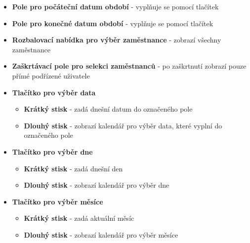 \documentclass{diplomka}
\begin{document}
\begin{itemize}
\item \textbf{Pole pro počáteční datum období} - vyplňuje se pomocí tlačítek
\item \textbf{Pole pro konečné datum období} - vyplňuje se pomocí tlačítek
\item \textbf{Rozbalovací nabídka pro výběr zaměstnance} - zobrazí všechny zaměstnance
\item \textbf{Zaškrtávací pole pro selekci zaměstnanců} - po zaškrtnutí zobrazí pouze přímé podřízené uživatele
\item \textbf{Tlačítko pro výběr data}
\begin{itemize}[noitemsep,nolistsep]
\item  \textbf{Krátký stisk} - zadá dnešní datum do označeného pole
\item  \textbf{Dlouhý stisk} - zobrazí kalendář pro výběr data, které vyplní do označeného pole
\end{itemize}
\item \textbf{Tlačítko pro výběr dne}
\begin{itemize}[noitemsep,nolistsep]
\item  \textbf{Krátký stisk} - zadá dnešní den
\item  \textbf{Dlouhý stisk} -  zobrazí kalendář pro výběr dne
\end{itemize}
\item \textbf{Tlačítko pro výběr měsíce}
\begin{itemize}[noitemsep,nolistsep]
\item  \textbf{Krátký stisk} - zadá aktuální měsíc
\item  \textbf{Dlouhý stisk} - zobrazí kalendář pro výběr měsíce
\end{itemize}
\end{itemize}
\end{document}
